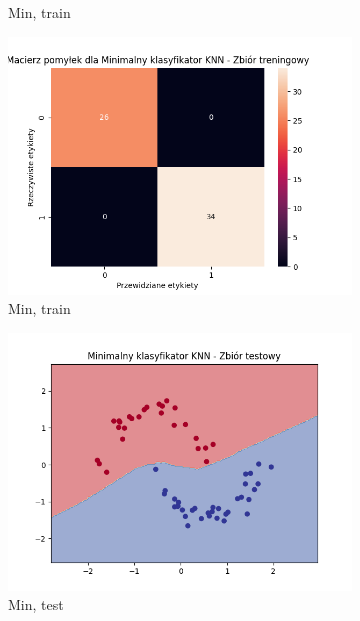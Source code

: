 \documentclass[12pt]{article}
\newcommand*{\subfigwidth}{0.24\textwidth}
\begin{document}
\begin{figure}[H]
\begin{subfigure}[t]{\subfigwidth}
        \caption{Min, train}
    \end{subfigure}
    \hfill
    \begin{subfigure}[t]{\subfigwidth}
        \includegraphics[width=\linewidth]{img/exp_3/knn/2_2/min/train_matrix.png}
        \caption{Min, train}
    \end{subfigure}
    \hfill
    \begin{subfigure}[t]{\subfigwidth}
        \includegraphics[width=\linewidth]{img/exp_3/knn/2_2/min/test_boundary.png}
        \caption{Min, test}
    \end{subfigure}
    \hfill
    \begin{subfigure}[t]{\subfigwidth}

\end{subfigure}
\end{figure}
\end{document}
